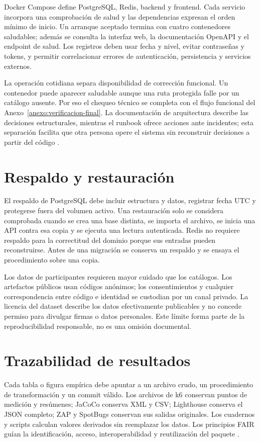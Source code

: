 \documentclass[11pt,a4paper]{report}
\begin{document}
Docker Compose define PostgreSQL, Redis, backend y frontend. Cada servicio incorpora
una comprobación de salud y las dependencias expresan el orden mínimo de inicio. Un
arranque aceptado termina con cuatro contenedores saludables; además se consulta la
interfaz web, la documentación OpenAPI y el endpoint de salud. Los registros deben
usar fecha y nivel, evitar contraseñas y tokens, y permitir correlacionar errores de
autenticación, persistencia y servicios externos.

La operación cotidiana separa disponibilidad de corrección funcional. Un contenedor
puede aparecer saludable aunque una ruta protegida falle por un catálogo ausente. Por
eso el chequeo técnico se completa con el flujo funcional del
Anexo~\ref{anexo:verificacion-final}. La documentación de arquitectura describe las
decisiones estructurales, mientras el runbook ofrece acciones ante incidentes; esta
separación facilita que otra persona opere el sistema sin reconstruir decisiones a
partir del código \cite{bass2021software,richards2020fundamentals}.

\section{Respaldo y restauración}

El respaldo de PostgreSQL debe incluir estructura y datos, registrar fecha UTC y
protegerse fuera del volumen activo. Una restauración solo se considera comprobada
cuando se crea una base distinta, se importa el archivo, se inicia una API contra esa
copia y se ejecuta una lectura autenticada. Redis no requiere respaldo para la
correctitud del dominio porque sus entradas pueden reconstruirse. Antes de una
migración se conserva un respaldo y se ensaya el procedimiento sobre una copia.

Los datos de participantes requieren mayor cuidado que los catálogos. Los artefactos
públicos usan códigos anónimos; los consentimientos y cualquier correspondencia entre
código e identidad se custodian por un canal privado. La licencia del dataset describe
los datos efectivamente publicables y no concede permiso para divulgar firmas o datos
personales. Este límite forma parte de la reproducibilidad responsable, no es una
omisión documental.

\section{Trazabilidad de resultados}

Cada tabla o figura empírica debe apuntar a un archivo crudo, un procedimiento de
transformación y un commit válido. Los archivos de k6 conservan puntos de medición y
resúmenes; JaCoCo conserva XML y CSV; Lighthouse conserva el JSON completo; ZAP y
SpotBugs conservan sus salidas originales. Los cuadernos y scripts calculan valores
derivados sin reemplazar los datos. Los principios FAIR guían la identificación,
acceso, interoperabilidad y reutilización del paquete \cite{wilkinson2016fair}.
\end{document}
